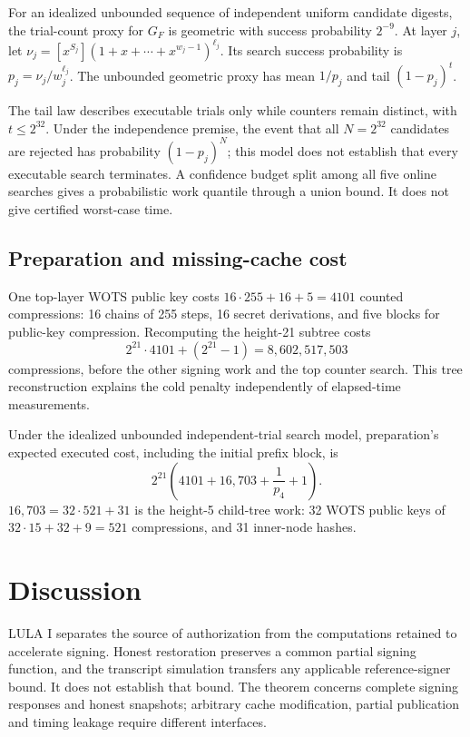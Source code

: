 \documentclass[a4paper,envcountsame,runningheads]{llncs}
\begin{document}
For an idealized unbounded sequence of independent uniform candidate digests, the trial-count proxy for $G_F$ is geometric with success probability $2^{-9}$. At layer $j$, let $\nu_j=[x^{S_j}](1+x+\cdots+x^{w_j-1})^{\ell_j}$. Its search success probability is $p_j=\nu_j/w_j^{\ell_j}$. The unbounded geometric proxy has mean $1/p_j$ and tail $(1-p_j)^t$.

The tail law describes executable trials only while counters remain distinct, with $t\le 2^{32}$. Under the independence premise, the event that all $N=2^{32}$ candidates are rejected has probability $(1-p_j)^N$; this model does not establish that every executable search terminates. A confidence budget split among all five online searches gives a probabilistic work quantile through a union bound. It does not give certified worst-case time.

\subsection{Preparation and missing-cache cost}
One top-layer WOTS public key costs $16\cdot255+16+5=4101$ counted compressions: 16 chains of 255 steps, 16 secret derivations, and five blocks for public-key compression. Recomputing the height-21 subtree costs
\[
 2^{21}\cdot4101+(2^{21}-1)=8{,}602{,}517{,}503
\]
compressions, before the other signing work and the top counter search. This tree reconstruction explains the cold penalty independently of elapsed-time measurements.

Under the idealized unbounded independent-trial search model, preparation's expected executed cost, including the initial prefix block, is
\[
 2^{21}\left(4101+16{,}703+\frac{1}{p_4}+1\right).
\]
$16{,}703=32\cdot521+31$ is the height-5 child-tree work: 32 WOTS public keys of $32\cdot15+32+9=521$ compressions, and 31 inner-node hashes.


\FloatBarrier

\section{Discussion}\label{sec:limits}
LULA I separates the source of authorization from the computations retained to accelerate signing. Honest restoration preserves a common partial signing function, and the transcript simulation transfers any applicable reference-signer bound. It does not establish that bound. The theorem concerns complete signing responses and honest snapshots; arbitrary cache modification, partial publication and timing leakage require different interfaces.
\end{document}
